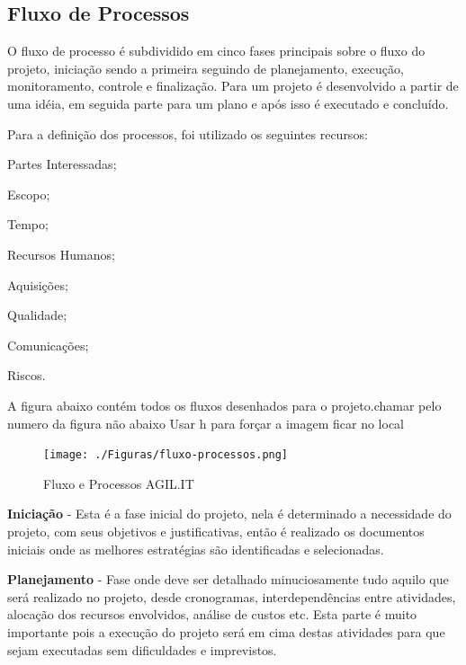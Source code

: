 {	\subsection{Fluxo de Processos}
	
	{O fluxo de processo é subdividido em cinco fases principais sobre o fluxo do projeto, iniciação sendo a primeira seguindo de planejamento, execução, monitoramento, controle e finalização. Para \cite{PMG2018} um projeto é desenvolvido a partir de uma idéia, em seguida parte para um plano e após isso é executado e concluído.}
	
	Para a definição dos processos, foi utilizado os seguintes recursos:
	
	\begin{subalineas}
		\item {Partes Interessadas};
		\item {Escopo};
		\item {Tempo};
		\item {Recursos Humanos};
		\item {Aquisições};
		\item {Qualidade};
		\item {Comunicações};
		\item {Riscos}.
	\end{subalineas}
	
	A figura abaixo contém todos os fluxos desenhados para o projeto.{\color{red}chamar pelo numero da figura não abaixo}
	{\color{red} Usar h para forçar a imagem ficar no local}
	
	\begin{figure}[h]
		\caption{\label{Fluxo-Processos}Fluxo e Processos AGIL.IT}
		\begin{center}
			\texttt{[image: ./Figuras/fluxo-processos.png]}
		\end{center}
	\end{figure}
	
	
	
	{\textbf{Iniciação} - Esta é a fase inicial do projeto, nela é determinado a necessidade do projeto, com seus objetivos e justificativas, então é realizado os documentos iniciais onde as melhores estratégias são identificadas e selecionadas.}
	
	{\textbf{Planejamento} - Fase onde deve ser detalhado minuciosamente tudo aquilo que será realizado no projeto, desde cronogramas, interdependências entre atividades, alocação dos recursos envolvidos, análise de custos etc. Esta parte é muito importante pois a execução do projeto será em cima destas atividades para que sejam executadas sem dificuldades e imprevistos.}
	
}

